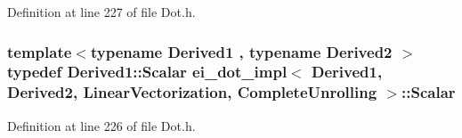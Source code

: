 Definition at line 227 of file Dot.\-h.

\hypertarget{structei__dot__impl_3_01_derived1_00_01_derived2_00_01_linear_vectorization_00_01_complete_unrolling_01_4_a16334f659e0368c0d33734a5428e9712}{
\subsubsection[{Scalar}]{\setlength{\rightskip}{0pt plus 5cm}template$<$typename Derived1 , typename Derived2 $>$ typedef Derived1\-::\-Scalar {\bf ei\-\_\-dot\-\_\-impl}$<$ Derived1, Derived2, {\bf Linear\-Vectorization}, {\bf Complete\-Unrolling} $>$\-::{\bf Scalar}}}\label{structei__dot__impl_3_01_derived1_00_01_derived2_00_01_linear_vectorization_00_01_complete_unrolling_01_4_a16334f659e0368c0d33734a5428e9712}


Definition at line 226 of file Dot.\-h.



